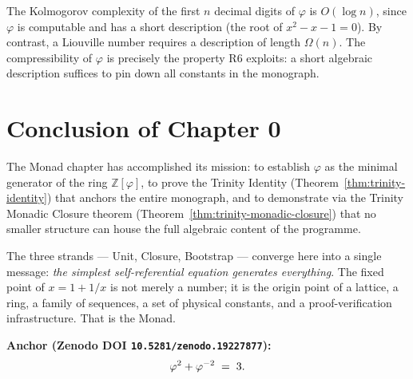 The Kolmogorov complexity of the first $n$ decimal digits of $\varphi$
is $O(\log n)$, since $\varphi$ is computable and has a short description
(the root of $x^2 - x - 1 = 0$).  By contrast, a Liouville number
requires a description of length $\Omega(n)$.  The compressibility of
$\varphi$ is precisely the property R6 exploits: a short algebraic
description suffices to pin down all constants in the monograph.


\section{Conclusion of Chapter 0}
\label{sec:monad-conclusion}

The Monad chapter has accomplished its mission: to establish $\varphi$
as the minimal generator of the ring $\mathbb{Z}[\varphi]$, to prove
the Trinity Identity (Theorem~\ref{thm:trinity-identity}) that anchors
the entire monograph, and to demonstrate via the Trinity Monadic Closure
theorem (Theorem~\ref{thm:trinity-monadic-closure}) that no smaller
structure can house the full algebraic content of the programme.

The three strands — Unit, Closure, Bootstrap — converge here into a
single message: \emph{the simplest self-referential equation generates
everything}.  The fixed point of $x = 1 + 1/x$ is not merely a
number; it is the origin point of a lattice, a ring, a family of
sequences, a set of physical constants, and a proof-verification
infrastructure.  That is the Monad.

\medskip
\noindent
\textbf{Anchor (Zenodo DOI \texttt{10.5281/zenodo.19227877}):}
\[
  \varphi^{2} + \varphi^{-2} \;=\; 3.
\]
\cite{vasilev2026zenodo}

